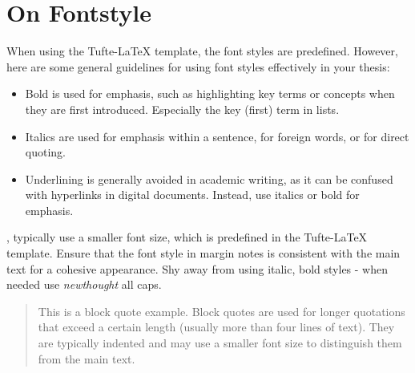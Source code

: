 \documentclass{../sharedAssets/tufte}
\begin{document}
\section{On Fontstyle}
When using the Tufte-LaTeX template, the font styles are predefined. However, here are some general guidelines for using font styles effectively in your thesis:
\begin{itemize}
  \item Bold is used for emphasis, such as highlighting key terms or concepts when they are first introduced. Especially the key (first) term in lists.
  \item Italics are used for emphasis within a sentence, for foreign words, or for direct quoting.
  \item Underlining is generally avoided in academic writing, as it can be confused with hyperlinks in digital documents. Instead, use italics or bold for emphasis.
\end{itemize}

, typically use a smaller font size, which is predefined in the Tufte-LaTeX template.
Ensure that the font style in margin notes is consistent with the main text for a cohesive appearance. Shy away from using italic, bold styles - when needed use \textit{newthought} all caps.

\begin{quote}
  This is a block quote example. Block quotes are used for longer quotations that exceed a certain length (usually more than four lines of text). They are typically indented and may use a smaller font size to distinguish them from the main text.
\end{quote}

\vfill
\end{document}
